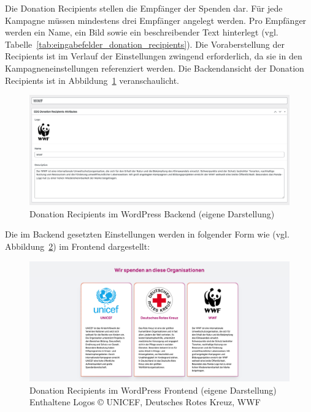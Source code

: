 Die Donation Recipients stellen die Empfänger der Spenden dar.
Für jede Kampagne müssen mindestens drei Empfänger angelegt werden.
Pro Empfänger werden ein Name, ein Bild sowie ein beschreibender Text hinterlegt (vgl. Tabelle~\ref{tab:eingabefelder_donation_recipients}).
Die Voraberstellung der Recipients ist im Verlauf der Einstellungen zwingend erforderlich, da sie in den Kampagneneinstellungen referenziert werden.
Die Backendansicht der Donation Recipients ist in Abbildung~\ref{fig:donation-recipients-settings-legacy} veranschaulicht.
\begin{figure}[H]
    \centering
    \includegraphics[width=1\textwidth]{images/legacy_donation_recipients_backend}
    \caption{Donation Recipients im WordPress Backend (eigene Darstellung)}
    \label{fig:donation-recipients-settings-legacy}
\end{figure}
Die im Backend gesetzten Einstellungen werden in folgender Form wie (vgl. Abbildung~\ref{fig:donation-recipients-frontend-legacy}) im Frontend dargestellt:
\begin{figure}[H]
    \centering
    \includegraphics[width=1\textwidth]{images/legacy_donation_recipients_frontend}
    \caption{Donation Recipients im WordPress Frontend (eigene Darstellung)\\Enthaltene Logos © UNICEF, Deutsches Rotes Kreuz, WWF \cite{ngo_logos}}
    \label{fig:donation-recipients-frontend-legacy}
\end{figure}

